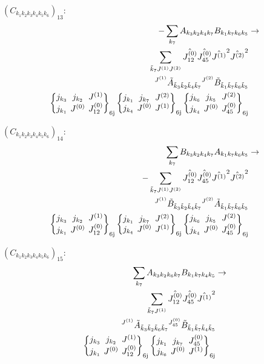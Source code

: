 \documentclass[11pt]{article}
\newcommand{\sixj}[6]{\begingroup\setlength{\arraycolsep}{0.2em}\begin{Bmatrix} #1 & #2 & #3 \\ #4 & #5 & #6 \end{Bmatrix}_{\text{6j}}\endgroup}
\begin{document}
$\left({C}_{{k}_{1}{k}_{2}{k}_{3}{k}_{4}{k}_{5}{k}_{6}}\right)_{13}$:
\begin{align}
-\sum_{{k}_{7}}{A}_{{k}_{3}{k}_{2}{k}_{4}{k}_{7}}{B}_{{k}_{1}{k}_{7}{k}_{6}{k}_{5}}&\rightarrow \notag \\\sum_{\tilde{k}_{7}J^{(1)}J^{(2)}}\hat{J^{(0)}_{12}}\hat{J^{(0)}_{45}}\hat{J^{(1)}}^{2}\hat{J^{(2)}}^{2}& \notag \\{}^{J^{(1)}}\tilde{A}_{\tilde{k}_{3}\tilde{k}_{2}\tilde{k}_{4}\tilde{k}_{7}}{}^{J^{(2)}}\tilde{B}_{\tilde{k}_{1}\tilde{k}_{7}\tilde{k}_{6}\tilde{k}_{5}}& \notag \\\sixj{j_{{k}_{3}}}{j_{{k}_{2}}}{J^{(1)}}{j_{{k}_{1}}}{J^{(0)}}{J^{(0)}_{12}}\sixj{j_{{k}_{1}}}{j_{{k}_{7}}}{J^{(2)}}{j_{{k}_{4}}}{J^{(0)}}{J^{(1)}}\sixj{j_{{k}_{6}}}{j_{{k}_{5}}}{J^{(2)}}{j_{{k}_{4}}}{J^{(0)}}{J^{(0)}_{45}}
\end{align}

$\left({C}_{{k}_{1}{k}_{2}{k}_{3}{k}_{4}{k}_{5}{k}_{6}}\right)_{14}$:
\begin{align}
\sum_{{k}_{7}}{B}_{{k}_{3}{k}_{2}{k}_{4}{k}_{7}}{A}_{{k}_{1}{k}_{7}{k}_{6}{k}_{5}}&\rightarrow \notag \\-\sum_{\tilde{k}_{7}J^{(1)}J^{(2)}}\hat{J^{(0)}_{12}}\hat{J^{(0)}_{45}}\hat{J^{(1)}}^{2}\hat{J^{(2)}}^{2}& \notag \\{}^{J^{(1)}}\tilde{B}_{\tilde{k}_{3}\tilde{k}_{2}\tilde{k}_{4}\tilde{k}_{7}}{}^{J^{(2)}}\tilde{A}_{\tilde{k}_{1}\tilde{k}_{7}\tilde{k}_{6}\tilde{k}_{5}}& \notag \\\sixj{j_{{k}_{3}}}{j_{{k}_{2}}}{J^{(1)}}{j_{{k}_{1}}}{J^{(0)}}{J^{(0)}_{12}}\sixj{j_{{k}_{1}}}{j_{{k}_{7}}}{J^{(2)}}{j_{{k}_{4}}}{J^{(0)}}{J^{(1)}}\sixj{j_{{k}_{6}}}{j_{{k}_{5}}}{J^{(2)}}{j_{{k}_{4}}}{J^{(0)}}{J^{(0)}_{45}}
\end{align}

$\left({C}_{{k}_{1}{k}_{2}{k}_{3}{k}_{4}{k}_{5}{k}_{6}}\right)_{15}$:
\begin{align}
\sum_{{k}_{7}}{A}_{{k}_{3}{k}_{2}{k}_{6}{k}_{7}}{B}_{{k}_{1}{k}_{7}{k}_{4}{k}_{5}}&\rightarrow \notag \\\sum_{\tilde{k}_{7}J^{(1)}}\hat{J^{(0)}_{12}}\hat{J^{(0)}_{45}}\hat{J^{(1)}}^{2}& \notag \\{}^{J^{(1)}}\tilde{A}_{\tilde{k}_{3}\tilde{k}_{2}\tilde{k}_{6}\tilde{k}_{7}}{}^{J^{(0)}_{45}}\tilde{B}_{\tilde{k}_{1}\tilde{k}_{7}\tilde{k}_{4}\tilde{k}_{5}}& \notag \\\sixj{j_{{k}_{3}}}{j_{{k}_{2}}}{J^{(1)}}{j_{{k}_{1}}}{J^{(0)}}{J^{(0)}_{12}}\sixj{j_{{k}_{1}}}{j_{{k}_{7}}}{J^{(0)}_{45}}{j_{{k}_{6}}}{J^{(0)}}{J^{(1)}}
\end{align}
\end{document}

